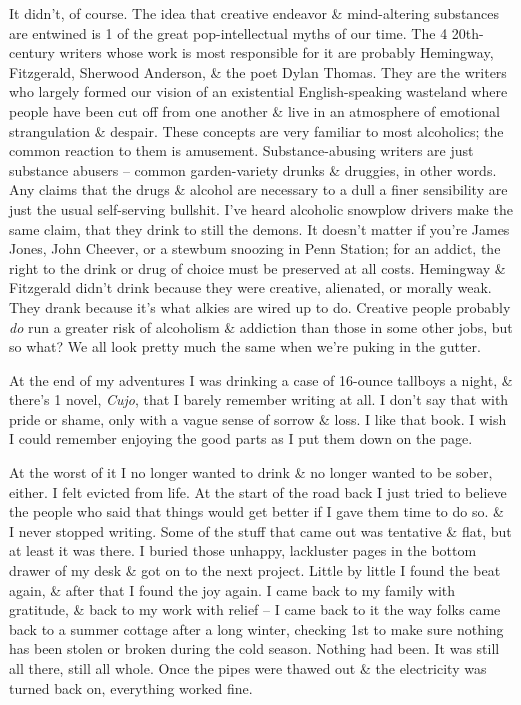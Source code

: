 \documentclass{article}
\numberwithin{equation}{section}
\begin{document}
It didn't, of course. The idea that creative endeavor \& mind-altering substances are entwined is 1 of the great pop-intellectual myths of our time. The 4 20th-century writers whose work is most responsible for it are probably Hemingway, Fitzgerald, Sherwood Anderson, \& the poet Dylan Thomas. They are the writers who largely formed our vision of an existential English-speaking wasteland where people have been cut off from one another \& live in an atmosphere of emotional strangulation \& despair. These concepts are very familiar to most alcoholics; the common reaction to them is amusement. Substance-abusing writers are just substance abusers -- common garden-variety drunks \& druggies, in other words. Any claims that the drugs \& alcohol are necessary to a dull a finer sensibility are just the usual self-serving bullshit. I've heard alcoholic snowplow drivers make the same claim, that they drink to still the demons. It doesn't matter if you're James Jones, John Cheever, or a stewbum snoozing in Penn Station; for an addict, the right to the drink or drug of choice must be preserved at all costs. Hemingway \& Fitzgerald didn't drink because they were creative, alienated, or morally weak. They drank because it's what alkies are wired up to do. Creative people probably \textit{do} run a greater risk of alcoholism \& addiction than those in some other jobs, but so what? We all look pretty much the same when we're puking in the gutter.

 At the end of my adventures I was drinking a case of 16-ounce tallboys a night, \& there's 1 novel, \textit{Cujo}, that I barely remember writing at all. I don't say that with pride or shame, only with a vague sense of sorrow \& loss. I like that book. I wish I could remember enjoying the good parts as I put them down on the page.

At the worst of it I no longer wanted to drink \& no longer wanted to be sober, either. I felt evicted from life. At the start of the road back I just tried to believe the people who said that things would get better if I gave them time to do  so. \& I never stopped writing. Some of the stuff that came out was tentative \& flat, but at least it was there. I buried those unhappy, lackluster pages in the bottom drawer of my desk \& got on to the next project. Little by little I found the beat again, \& after that I found the joy again. I came back to my family with gratitude, \& back to my work with relief -- I came back to it the way folks came back to a summer cottage after a long winter, checking 1st to make sure nothing has been stolen or broken during the cold season. Nothing had been. It was still all there, still all whole. Once the pipes were thawed out \& the electricity was turned back on, everything worked fine.
\end{document}

